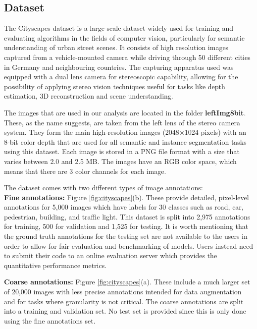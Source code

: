 \subsection{Dataset}

The Cityscapes dataset is a large-scale dataset widely used for training and evaluating algorithms in the fields of computer vision, particularly for semantic understanding of urban street scenes. It consists of high resolution images captured from a vehicle-mounted camera while driving through 50 different cities in Germany and neighbouring countries. The capturing apparatus used was equipped with a dual lens camera for stereoscopic capability, allowing for the possibility of applying stereo vision techniques useful for tasks like depth estimation, 3D reconstruction and scene understanding. 

The images that are used in our analysis are located in the folder \textbf{leftImg8bit}. These, as the name suggests, are taken from the left lens of the stereo camera system. They form the main high-resolution images (2048$\times$1024 pixels) with an 8-bit color depth that are used for all semantic and instance segmentation tasks using this dataset. Each image is stored in a PNG file format with a size that varies between 2.0 and 2.5 MB. The images have an RGB color space, which means that there are 3 color channels for each image.

The dataset comes with two different types of image annotations:\\
\textbf{Fine annotations:} Figure \ref{fig:cityscapes}(b). These provide detailed, pixel-level annotations for 5,000 images which have labels for 30 classes such as road, car, pedestrian, building, and traffic light. This dataset is split into 2,975 annotations for training, 500 for validation and 1,525 for testing. It is worth mentioning that the ground truth annotations for the testing set are not available to the users in order to allow for fair evaluation and benchmarking of models. Users instead need to submit their code to an online evaluation server which provides the quantitative performance metrics.    

\textbf{Coarse annotations:} Figure \ref{fig:cityscapes}(a). These include a much larger set of 20,000 images with less precise annotations intended for data augmentation and for tasks where granularity is not critical. The coarse annotations are split into a training and validation set. No test set is provided since this is only done using the fine annotations set. 

